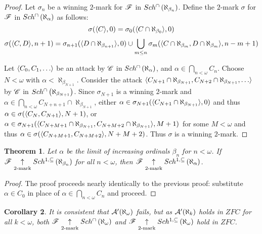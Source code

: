 \documentclass{rmmcart}
\theoremstyle{plain}
\newtheorem{theorem}{Theorem}
\newtheorem{corollary}[theorem]{Corollary}
\theoremstyle{definition}
\theoremstyle{remark}
\theoremstyle{plain}
\theoremstyle{definition}
\theoremstyle{remark}
\begin{document}
  \begin{proof}
    Let \(\sigma_n\) be a winning \(2\)-mark for \(\mathscr{F}\) in
    \(Sch^{\cap}\left({\aleph_{\beta_n}}\right)\). Define the \(2\)-mark \(\sigma\)
    for \(\mathscr{F}\) in \(Sch^{\cap}\left({\aleph_\alpha}\right)\) as follows:
    \[
      \sigma(\langle C\rangle,0)
        =
      \sigma_0(\langle C\cap\aleph_{\beta_0}\rangle,0)
    \]
    \[
      \sigma(\langle C,D\rangle,n+1)
        =
      \sigma_{n+1}(\langle D\cap\aleph_{\beta_{n+1}}\rangle,0)
        \cup
      \bigcup_{m\leq n}
      \sigma_m(\langle C\cap\aleph_{\beta_m},D\cap\aleph_{\beta_m}\rangle,n-m+1)
    \]

    Let \(\<C_0,C_1,\dots\>\) be an attack by
    \(\mathscr{C}\) in \(Sch^{\cap}\left({\aleph_\alpha}\right)\), and
    \(\alpha\in\bigcap_{n<\omega}C_n\).
    Choose \(N<\omega\) with \(\alpha<\aleph_{\beta_{N+1}}\). Consider the
    attack
    \(\<C_{N+1}\cap\aleph_{\beta_{N+1}},C_{N+2}\cap\aleph_{\beta_{N+1}},\dots\>\)
    by \(\mathscr{C}\) in \(Sch^{\cap}\left({\aleph_{\beta_{N+1}}}\right)\). Since
    \(\sigma_{N+1}\) is a winning \(2\)-mark and
    \(\alpha\in\bigcap_{n<\omega}C_{N+n+1}\cap\aleph_{\beta_{N+1}}\), either
    \(\alpha\in\sigma_{N+1}(\langle C_{N+1}\cap\aleph_{\beta_{N+1}}\rangle,0)\) and thus
    \(\alpha\in\sigma(\langle C_N,C_{N+1}\rangle,N+1)\), or
    \(
      \alpha
        \in
      \sigma_{N+1}(
        \langle C_{N+M+1}\cap\aleph_{\beta_{N+1}},C_{N+M+2}\cap\aleph_{\beta_{N+1}}\rangle
        ,M+1
      )
    \)
    for some \(M<\omega\) and thus
    \(
      \alpha
        \in
      \sigma(
        \langle C_{N+M+1},C_{N+M+2}\rangle,
        N+M+2
      )
    \). Thus \(\sigma\) is a winning \(2\)-mark.
  \end{proof}

  \begin{theorem}
    Let \(\alpha\) be the limit of increasing ordinals \(\beta_n\) for \(n<\omega\).
    If \(\mathscr{F} \underset{2\text{-mark}}{\uparrow}Sch^{1,\subseteq}\left({\aleph_{\beta_n}}\right)\) for all
    \(n<\omega\), then \(\mathscr{F}\underset{2\text{-mark}}{\uparrow}Sch^{1,\subseteq}\left({\aleph_\alpha}\right)\).
  \end{theorem}

  \begin{proof}
    The proof proceeds nearly identically to the previous proof: substitute
    \(\alpha\in C_0\) in place of \(\alpha\in\bigcap_{n<\omega}C_n\) and proceed.
  \end{proof}

  \begin{corollary}
    It is consistent that \(\mathcal{A}'(\aleph_\omega)\) fails,
    but as \(\mathcal{A}'(\aleph_k)\) holds in \(ZFC\) for all \(k<\omega\),
    both
    \(\mathscr{F}\underset{2\text{-mark}}{\uparrow}Sch^{\cap}\left({\aleph_\omega}\right)\) and
    \(\mathscr{F}\underset{2\text{-mark}}{\uparrow}Sch^{1,\subseteq}\left({\aleph_\omega}\right)\) hold in \(ZFC\).
  \end{corollary}
\end{document}
